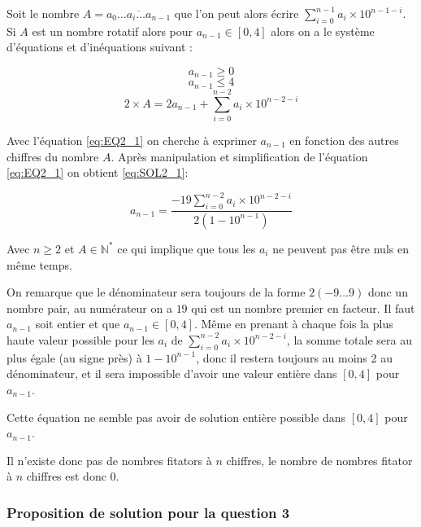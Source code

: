 \documentclass{article}
\begin{document}
Soit le nombre $A = \overline{a_0 \ldots a_i \ldots a_{n-1}}$ que l'on peut alors écrire $\sum_{i=0}^{n-1} a_i \times 10^{n-1-i}$.
Si $A$ est un nombre rotatif alors pour $a_{n-1} \in [0,4]$  alors on a le système d'équations et d'inéquations suivant :

\begin{equation}
    a_{n-1} \ge 0
    \label{eq:INEQ2_1}
\end{equation}
\begin{equation}
    a_{n-1} \le 4
    \label{eq:INEQ2_2}
\end{equation}
\begin{equation}
    2 \times A = 2a_{n-1} + \sum_{i=0}^{n-2} a_i \times 10^{n-2-i}
    \label{eq:EQ2_1}
\end{equation}

Avec l'équation \ref{eq:EQ2_1} on cherche à exprimer $a_{n-1}$ en fonction des autres chiffres du nombre $A$.
Après manipulation et simplification de l'équation \ref{eq:EQ2_1} on obtient \ref{eq:SOL2_1}:

\begin{equation}
    a_{n-1} = \frac{{-19}\sum_{i=0}^{n-2} a_i \times 10^{n-2-i}}{2(1-10^{n-1})} 
    \label{eq:SOL2_1}
\end{equation}

Avec $n \ge 2$ et $A \in \mathbb{N}^*$ ce qui implique que tous les $a_i$ ne peuvent pas être nuls en même temps.

On remarque que le dénominateur sera toujours de la forme $2({-9\ldots9})$ donc un nombre pair, au numérateur on a $19$ qui est un nombre premier en facteur. Il faut $a_{n-1}$ soit entier et que $a_{n-1} \in [0,4]$.
Même en prenant à chaque fois la plus haute valeur possible pour les $a_i$ de $\sum_{i=0}^{n-2} a_i \times 10^{n-2-i}$, la somme totale sera au plus égale (au signe près) à $1-10^{n-1}$, donc il restera toujours au moins 2 au dénominateur, et il sera impossible d'avoir une valeur entière dans $[0,4]$ pour $a_{n-1}$.

Cette équation ne semble pas avoir de solution entière possible dans $[0,4]$ pour $a_{n-1}$.

Il n'existe donc pas de nombres fitators à $n$ chiffres, le nombre de nombres fitator à $n$ chiffres est donc $0$.

\subsubsection{Proposition de solution pour la question 3}
\end{document}
